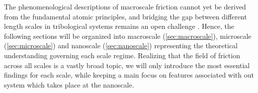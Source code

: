 The phenomenological descriptions of macroscale friction cannot yet be derived
from the fundamental atomic principles, and bridging the gap between different
length scales in tribological systems remains an open challenge
\cite{Manini_2016}. Hence, the following sections will be organized into
macroscale (\cref{sec:macroscale}), microscale (\cref{sec:microscale}) and
nanoscale (\cref{sec:nanoscale}) representing the theoretical understanding
governing each scale regime. Realizing that the field of friction across all
scales is a vastly broad topic, we will only introduce the most essential findings for each scale, while keeping a main focus on features associated with out system which takes place at the nanoscale.



















